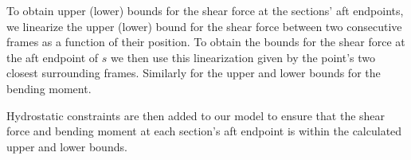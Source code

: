 To obtain upper (lower) bounds for the shear force at the sections' aft endpoints,  
we linearize the upper (lower) bound for the shear force between two consecutive frames as a function of their position. To obtain the bounds for the shear force at the aft endpoint of $s$ we then use this linearization given by the point's two closest surrounding frames. Similarly for the upper and lower bounds for the bending moment.

Hydrostatic constraints are then added to our model to ensure that the shear force and bending moment at each section's aft endpoint is within the calculated upper and lower bounds.

%
